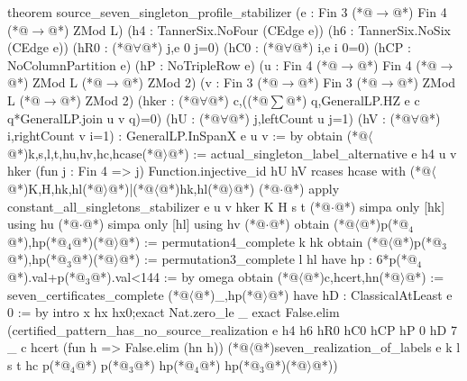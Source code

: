theorem source_seven_singleton_profile_stabilizer
    (e : Fin 3 (*@$\to$@*) Fin 4 (*@$\to$@*) ZMod L)
    (h4 : TannerSix.NoFour (CEdge e)) (h6 : TannerSix.NoSix (CEdge e))
    (hR0 : (*@$\forall$@*) j,e 0 j=0) (hC0 : (*@$\forall$@*) i,e i 0=0)
    (hCP : NoColumnPartition e) (hP : NoTripleRow e)
    (u : Fin 4 (*@$\to$@*) Fin 4 (*@$\to$@*) ZMod L (*@$\to$@*) ZMod 2)
    (v : Fin 3 (*@$\to$@*) Fin 3 (*@$\to$@*) ZMod L (*@$\to$@*) ZMod 2)
    (hker : (*@$\forall$@*) c,((*@$\sum$@*) q,GeneralLP.HZ e c q*GeneralLP.join u v q)=0)
    (hU : (*@$\forall$@*) j,leftCount u j=1) (hV : (*@$\forall$@*) i,rightCount v i=1) :
    GeneralLP.InSpanX e u v := by
  obtain (*@$\langle$@*)k,s,l,t,hu,hv,hc,hcase(*@$\rangle$@*) := actual_singleton_label_alternative e h4 u v hker
    (fun j : Fin 4 => j) Function.injective_id hU hV
  rcases hcase with (*@$\langle$@*)K,H,hk,hl(*@$\rangle$@*)|(*@$\langle$@*)hk,hl(*@$\rangle$@*)
  (*@$\cdot$@*) apply constant_all_singletons_stabilizer e u v hker K H s t
    (*@$\cdot$@*) simpa only [hk] using hu
    (*@$\cdot$@*) simpa only [hl] using hv
  (*@$\cdot$@*) obtain (*@$\langle$@*)p(*@${}_4$@*),hp(*@${}_4$@*)(*@$\rangle$@*) := permutation4_complete k hk
    obtain (*@$\langle$@*)p(*@${}_3$@*),hp(*@${}_3$@*)(*@$\rangle$@*) := permutation3_complete l hl
    have hp : 6*p(*@${}_4$@*).val+p(*@${}_3$@*).val<144 := by omega
    obtain (*@$\langle$@*)c,hcert,hn(*@$\rangle$@*) := seven_certificates_complete (*@$\langle$@*)_,hp(*@$\rangle$@*)
    have hD : ClassicalAtLeast e 0 := by intro x hx hx0;exact Nat.zero_le _
    exact False.elim (certified_pattern_has_no_source_realization e h4 h6 hR0 hC0 hCP hP
      0 hD 7 _ c hcert (fun h => False.elim (hn h))
      (*@$\langle$@*)seven_realization_of_labels e k l s t hc p(*@${}_4$@*) p(*@${}_3$@*) hp(*@${}_4$@*) hp(*@${}_3$@*)(*@$\rangle$@*))
